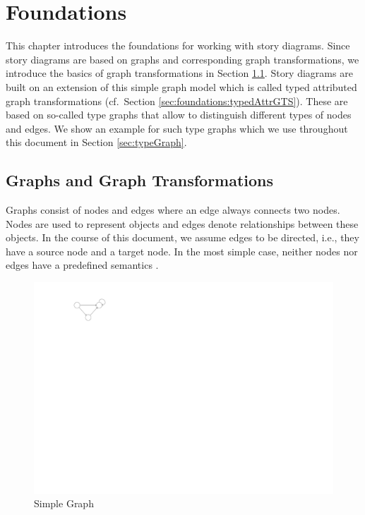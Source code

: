 \chapter{Foundations}
\label{sec:foundations}

This chapter introduces the foundations for working with story diagrams.
Since story diagrams are based on graphs and corresponding graph transformations,
we introduce the basics of graph transformations in Section \ref{sec:foundations:simpleGTS}.
Story diagrams are built on an extension of this simple graph model which is called typed attributed graph transformations (cf.\ Section \ref{sec:foundations:typedAttrGTS}).
These are based on so-called type graphs that allow to distinguish different types of nodes and edges.
We show an example for such type graphs which we use throughout this document in Section \ref{sec:typeGraph}.

\section{Graphs and Graph Transformations}
\label{sec:foundations:simpleGTS}

Graphs consist of nodes and edges where an edge always connects two nodes. Nodes are used to represent objects and edges denote relationships between these objects. In the course of this document, we assume edges to be directed, i.e., they have a source node and a target node. In the most simple case, neither nodes nor edges have a predefined semantics \cite{Roz97}.

\begin{figure}[htbp]
  \centering
  \includegraphics[scale=1.5]{figures/SimpleGraph}
  \caption{Simple Graph}
  \label{fig:simpleGraph}
\end{figure}


